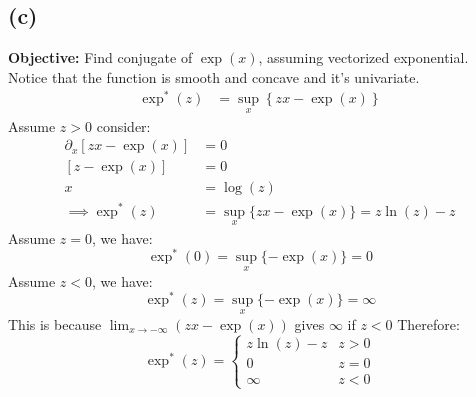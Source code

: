 \documentclass[]{article}
\begin{document}
    \subsection*{(c)}
        \textbf{Objective: }Find conjugate of $\exp(x)$, assuming vectorized exponential. Notice that the function is smooth and concave and it's univariate. 
        \begin{align*}\tag{1c1}\label{eqn:1c1}
            \exp^*(z) &= \sup_{x} \left\lbrace
            zx - \exp(x)
            \right\rbrace
        \end{align*}
        Assume $z > 0$ consider: 
        \begin{align*}\tag{1c2}\label{eqn:1c2}
            \partial_x[zx - \exp(x)] &= 0
            \\
            [z - \exp(x)] &= 0
            \\
            x &= \log(z)
            \\
            \implies  \exp^*(z) &= \sup_{x} \{zx - \exp(x)\} = z\ln(z) - z
        \end{align*}
        Assume $z = 0$, we have: 
        \begin{equation*}\tag{1c3}\label{eqn:1c3}
            \exp^*(0) = \sup_x \{- \exp(x)\} = 0
        \end{equation*}
        Assume $z < 0$, we have: 
        \begin{equation*}\tag{1c4}\label{eqn:1c4}
            \exp^*(z) = \sup_x \{- \exp(x)\} = \infty
        \end{equation*}
        This is because $\lim_{x\rightarrow -\infty} (zx - \exp(x))$ gives $\infty$ if $z < 0$
        Therefore:
        $$
            \exp^*(z) = \begin{cases}
                z\ln(z) - z & z > 0
                \\
                0 & z = 0 
                \\
                \infty & z < 0
            \end{cases}
        $$
\end{document}
